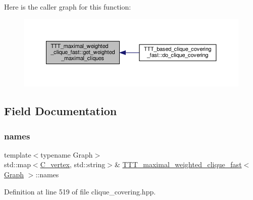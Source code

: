 Here is the caller graph for this function\+:
\nopagebreak
\begin{figure}[H]
\begin{center}
\leavevmode
\includegraphics[width=350pt]{d4/d7c/classTTT__maximal__weighted__clique__fast_af875360ed6a8408976791c7d39adada9_icgraph}
\end{center}
\end{figure}


\subsection{Field Documentation}
\mbox{\label{classTTT__maximal__weighted__clique__fast_a8a28c9efad9dfb4eba9948cfc9f34ff0}} 
\subsubsection{\texorpdfstring{names}{names}}
{\footnotesize\ttfamily template$<$typename Graph$>$ \\
std\+::map$<$\hyperlink{clique__covering__graph_8hpp_a9cb45047ea8c5ed95a8cfa90494345aa}{C\+\_\+vertex}, std\+::string$>$\& \hyperlink{classTTT__maximal__weighted__clique__fast}{T\+T\+T\+\_\+maximal\+\_\+weighted\+\_\+clique\+\_\+fast}$<$ \hyperlink{structGraph}{Graph} $>$\+::names\hspace{0.3cm}{\ttfamily [private]}}



Definition at line 519 of file clique\+\_\+covering.\+hpp.

\mbox{\label{classTTT__maximal__weighted__clique__fast_a88fdb331d74898bd24f3a0c18ac7ed6d}} 
